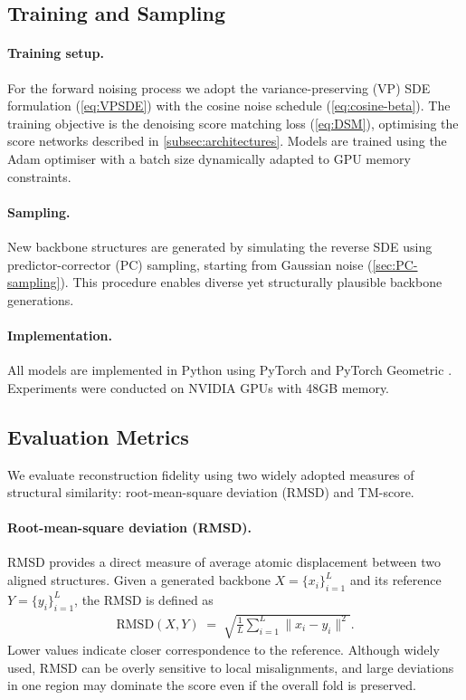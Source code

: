\documentclass[a4paper,12pt]{article}
\begin{document}
\subsection{Training and Sampling}
\paragraph{Training setup.}
For the forward noising process we adopt the variance-preserving (VP) SDE formulation (\cref{eq:VPSDE}) with the cosine noise schedule (\cref{eq:cosine-beta}). The training objective is the denoising score matching loss (\cref{eq:DSM}), optimising the score networks described in \cref{subsec:architectures}. Models are trained using the Adam optimiser \citep{kingma2017AdamMethodStochastic} with a batch size dynamically adapted to GPU memory constraints.

\paragraph{Sampling.}
New backbone structures are generated by simulating the reverse SDE using predictor-corrector (PC) sampling, starting from Gaussian noise (\cref{sec:PC-sampling}). This procedure enables diverse yet structurally plausible backbone generations.

\paragraph{Implementation.}
All models are implemented in Python using PyTorch and PyTorch Geometric \citep{PyG1.0,PyG2.0}. 
Experiments were conducted on NVIDIA GPUs with 48GB memory.

\subsection{Evaluation Metrics}\label{subsec:metrics}
We evaluate reconstruction fidelity using two widely adopted measures of structural similarity: root-mean-square deviation (RMSD) and TM-score.

\paragraph{Root-mean-square deviation (RMSD).}
RMSD provides a direct measure of average atomic displacement between two aligned structures. 
Given a generated backbone \(X=\{x_i\}_{i=1}^L\) and its reference \(Y=\{y_i\}_{i=1}^L\), 
the RMSD is defined as
\begin{align*}
    \mathrm{RMSD}(X, Y) \;=\; \sqrt{\frac{1}{L}\sum_{i=1}^{L} \|x_i - y_i\|^2}.
\end{align*}
Lower values indicate closer correspondence to the reference. 
Although widely used, RMSD can be overly sensitive to local misalignments, 
and large deviations in one region may dominate the score even if the overall fold is preserved.
\end{document}
